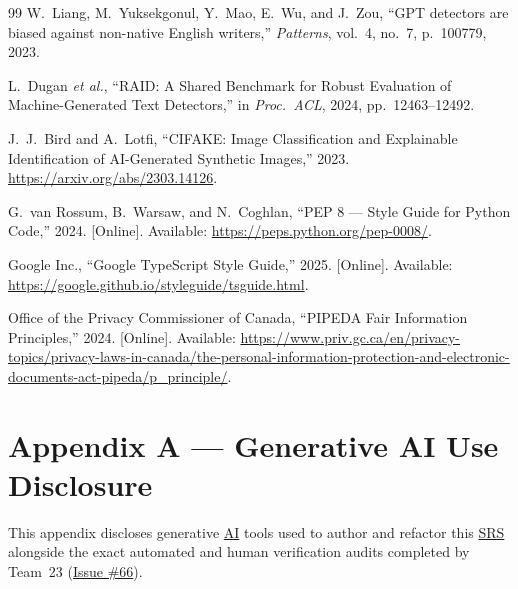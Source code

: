 \documentclass[11pt]{article}
\newcommand{\AI}{\hyperlink{acr-ai}{AI}}
\newcommand{\SRS}{\hyperlink{acr-srs}{SRS}}
\begin{document}
\begin{thebibliography}{99}
W.~Liang, M.~Yuksekgonul, Y.~Mao, E.~Wu, and J.~Zou, ``GPT detectors are biased against non-native English writers,'' \emph{Patterns}, vol.~4, no.~7, p.~100779, 2023.

L.~Dugan \emph{et al.}, ``RAID: A Shared Benchmark for Robust Evaluation of Machine-Generated Text Detectors,'' in \emph{Proc.\ ACL}, 2024, pp.~12463--12492.

J.~J.~Bird and A.~Lotfi, ``CIFAKE: Image Classification and Explainable Identification of AI-Generated Synthetic Images,'' 2023. \url{https://arxiv.org/abs/2303.14126}.

G.~van Rossum, B.~Warsaw, and N.~Coghlan, ``PEP 8 --- Style Guide for Python Code,'' 2024. [Online]. Available: \url{https://peps.python.org/pep-0008/}.

Google Inc., ``Google TypeScript Style Guide,'' 2025. [Online]. Available: \url{https://google.github.io/styleguide/tsguide.html}.

Office of the Privacy Commissioner of Canada, ``PIPEDA Fair Information Principles,'' 2024. [Online]. Available: \url{https://www.priv.gc.ca/en/privacy-topics/privacy-laws-in-canada/the-personal-information-protection-and-electronic-documents-act-pipeda/p_principle/}.

\end{thebibliography}

\newpage

\section*{Appendix A --- Generative AI Use Disclosure}\label{sec:genai-disclosure}

This appendix discloses generative \AI{} tools used to author and refactor this \SRS{} alongside the exact automated and human verification audits completed by Team~23 (\href{https://github.com/richy1337/Verity/issues/66}{Issue \#66}).
\end{document}
